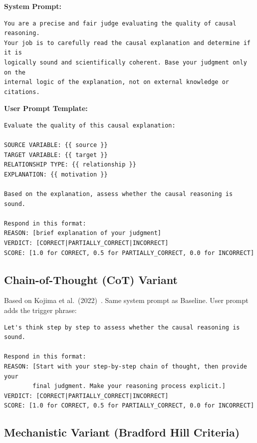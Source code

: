\noindent\textbf{System Prompt:}
\begin{small}
\begin{verbatim}
You are a precise and fair judge evaluating the quality of causal reasoning.
Your job is to carefully read the causal explanation and determine if it is
logically sound and scientifically coherent. Base your judgment only on the
internal logic of the explanation, not on external knowledge or citations.
\end{verbatim}
\end{small}

\noindent\textbf{User Prompt Template:}
\begin{small}
\begin{verbatim}
Evaluate the quality of this causal explanation:

SOURCE VARIABLE: {{ source }}
TARGET VARIABLE: {{ target }}
RELATIONSHIP TYPE: {{ relationship }}
EXPLANATION: {{ motivation }}

Based on the explanation, assess whether the causal reasoning is sound.

Respond in this format:
REASON: [brief explanation of your judgment]
VERDICT: [CORRECT|PARTIALLY_CORRECT|INCORRECT]
SCORE: [1.0 for CORRECT, 0.5 for PARTIALLY_CORRECT, 0.0 for INCORRECT]
\end{verbatim}
\end{small}

\subsection{Chain-of-Thought (CoT) Variant}
\label{sec:prompt_judge_correctness_cot}

Based on Kojima et al.\ (2022)~\cite{kojima2022large}. Same system prompt as Baseline. User prompt adds the trigger phrase:

\begin{small}
\begin{verbatim}
Let's think step by step to assess whether the causal reasoning is sound.

Respond in this format:
REASON: [Start with your step-by-step chain of thought, then provide your
        final judgment. Make your reasoning process explicit.]
VERDICT: [CORRECT|PARTIALLY_CORRECT|INCORRECT]
SCORE: [1.0 for CORRECT, 0.5 for PARTIALLY_CORRECT, 0.0 for INCORRECT]
\end{verbatim}
\end{small}

\subsection{Mechanistic Variant (Bradford Hill Criteria)}
\label{sec:prompt_judge_correctness_mechanistic}

